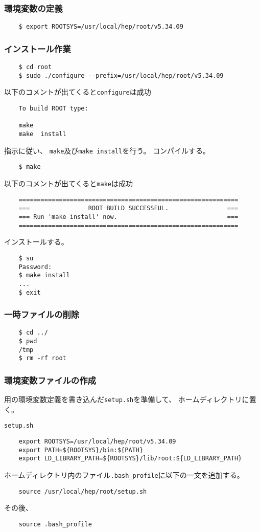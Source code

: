    \subsubsection*{環境変数の定義}
\begin{verbatim}
	$ export ROOTSYS=/usr/local/hep/root/v5.34.09
\end{verbatim}


   \subsubsection*{インストール作業}
\begin{verbatim}
	$ cd root
	$ sudo ./configure --prefix=/usr/local/hep/root/v5.34.09
\end{verbatim}
以下のコメントが出てくると\texttt{configure}は成功
\begin{verbatim}
	To build ROOT type:

	make
	make  install
\end{verbatim}
指示に従い、
\verb|make|及び\verb|make install|を行う。
コンパイルする。
\begin{verbatim}
	$ make
\end{verbatim}
以下のコメントが出てくると\texttt{make}は成功
\begin{verbatim}
	============================================================
	===                ROOT BUILD SUCCESSFUL.                ===
	=== Run 'make install' now.                              ===
	============================================================
\end{verbatim}
インストールする。
\begin{verbatim}
	$ su
	Password:
	$ make install
	...
	$ exit
\end{verbatim}


   \subsubsection*{一時ファイルの削除}
\begin{verbatim}
	$ cd ../
	$ pwd
	/tmp
	$ rm -rf root
\end{verbatim}


   \subsubsection*{環境変数ファイルの作成}
   \ROOT 用の環境変数定義を書き込んだ\verb|setup.sh|を準備して、
   ホームディレクトリに置く。
   \begin{itembox}{\texttt{setup.sh}}
\begin{verbatim}
	export ROOTSYS=/usr/local/hep/root/v5.34.09
	export PATH=${ROOTSYS}/bin:${PATH} 
	export LD_LIBRARY_PATH=${ROOTSYS}/lib/root:${LD_LIBRARY_PATH}
\end{verbatim}
   \end{itembox}
   ホームディレクトリ内のファイル\verb|.bash_profile|に以下の一文を追加する。
\begin{verbatim}
	source /usr/local/hep/root/setup.sh
\end{verbatim}
その後、
\begin{verbatim}
	source .bash_profile
\end{verbatim}
 